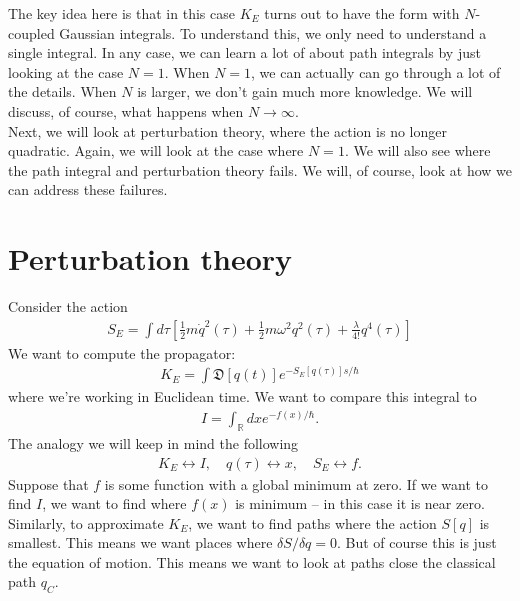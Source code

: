 \documentclass{book}
\theoremstyle{definition}
\newcommand{\R}{\mathbb{R}}
\newcommand{\f}[2]{\frac{#1}{#2}}
\newcommand{\lb}{\left[}
\newcommand{\rb}{\right]}
\begin{document}
The key idea here is that in this case $K_E$ turns out to have the form with $N$-coupled Gaussian integrals. To understand this, we only need to understand a single integral. In any case, we can learn a lot of about path integrals by just looking at the case $N=1$. When $N=1$, we can actually can go through a lot of the details. When $N$ is larger, we don't gain much more knowledge. We will discuss, of course, what happens when $N \to \infty$. \\


Next, we will look at perturbation theory, where the action is no longer quadratic. Again, we will look at the case where $N=1$. We will also see where the path integral and perturbation theory fails. We will, of course, look at how we can address these failures. 




















\newpage

\section{Perturbation theory}


Consider the action
\begin{align}
S_E = \int d\tau \lb \f{1}{2}m\dot{q}^2(\tau) + \f{1}{2}m\omega^2q^2(\tau) + \f{\lambda}{4!}q^4(\tau) \rb
\end{align}
We want to compute the propagator:
\begin{align}
K_E = \int \mathfrak{D}[q(t)] e^{-S_E[q(\tau)]s/\hbar}
\end{align}
where we're working in Euclidean time. We want to compare this integral to 
\begin{align}
I = \int_\R dx e^{-f(x)/\hbar}.
\end{align}
The analogy we will keep in mind the following
\begin{align}
K_E \leftrightarrow I, \quad q(\tau) \leftrightarrow x, \quad S_E \leftrightarrow f.
\end{align}
Suppose that $f$ is some function with a global minimum at zero. If we want to find $I$, we want to find where $f(x)$ is minimum -- in this case it is near zero. Similarly, to approximate $K_E$, we want to find paths where the action $S[q]$ is smallest. This means we want places where $\delta S / \delta q = 0$. But of course this is just the equation of motion. This means we want to look at paths close the classical path $q_C$. \\
\end{document}
